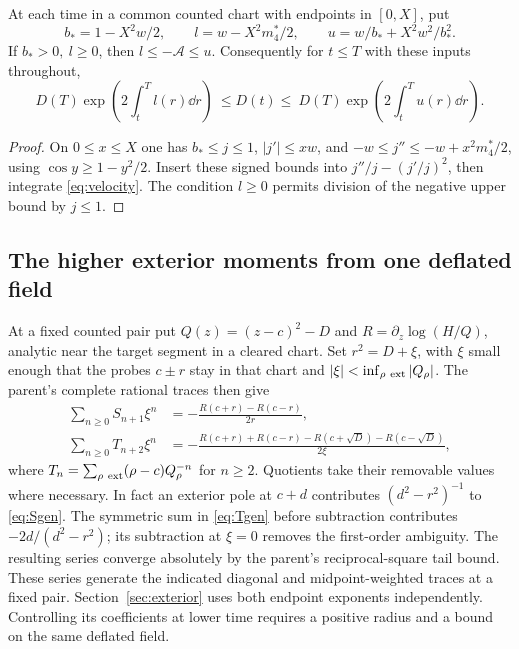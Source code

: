 \begin{proposition}\label{prop:finite}
At each time in a common counted chart with endpoints in \([0,X]\), put
\[
 b_* =1-X^2 w/2,\qquad
 l=w-X^2m_4^*/2,\qquad u=w/b_*+X^2w^2/b_*^2 .
\]
If \(b_*>0,\ l\ge0\), then \(l\le-\mathcal A\le u\).
Consequently for \(t\le T\) with these inputs throughout,
\begin{equation}
 D(T)\exp\!\left(2\int_t^T l(r)\dd r\right)
 \ \le D(t)\le\
 D(T)\exp\!\left(2\int_t^T u(r)\dd r\right).
 \label{eq:slab}
\end{equation}
\end{proposition}
\begin{proof}
On \(0\le x\le X\) one has \(b_*\le j\le1\), \(|j'|\le xw\), and
\(-w\le j''\le-w+x^2m_4^*/2\), using \(\cos y\ge1-y^2/2\).
Insert these signed bounds into \(j''/j-(j'/j)^2\), then integrate \eqref{eq:velocity}. The condition \(l\ge0\) permits division of the negative upper bound by \(j\le1\).
\end{proof}

\subsection{The higher exterior moments from one deflated field}
At a fixed counted pair put \(Q(z)=(z-c)^2-D\) and
\(R=\partial_z\log(H/Q)\), analytic near the target segment in a cleared chart. Set \(r^2=D+\xi\), with \(\xi\) small enough that the probes \(c\pm r\) stay in that chart and \(|\xi|<\inf_{\rho\ {\rm ext}}|Q_\rho|\). The parent's complete rational traces \cite[\S3]{AGC} then give
\begin{align}
 \sum_{n\ge0}S_{n+1}\xi^n
 &=-\frac{R(c+r)-R(c-r)}{2r}, \label{eq:Sgen}\\
 \sum_{n\ge0}T_{n+2}\xi^n
 &=-\frac{R(c+r)+R(c-r)-R(c+\sqrt D)-R(c-\sqrt D)}{2\xi},\label{eq:Tgen}
\end{align}
where \(T_n=\sum_{\rho\ {\rm ext}}(\rho-c)Q_\rho^{-n}\) for \(n\ge2\). Quotients take their removable values where necessary. In fact an exterior pole at \(c+d\) contributes \((d^2-r^2)^{-1}\) to \eqref{eq:Sgen}. The symmetric sum in \eqref{eq:Tgen} before subtraction contributes \(-2d/(d^2-r^2)\); its subtraction at \(\xi=0\) removes the first-order ambiguity. The resulting series converge absolutely by the parent's reciprocal-square tail bound. These series generate the indicated diagonal and midpoint-weighted traces at a fixed pair. Section~\ref{sec:exterior} uses both endpoint exponents independently. Controlling its coefficients at lower time requires a positive radius and a bound on the same deflated field.
